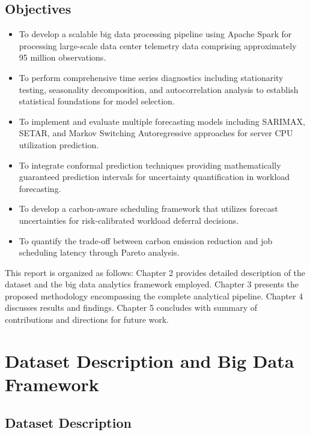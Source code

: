 \documentclass[12pt]{report}
\begin{document}
\section{Objectives}
\begin{itemize}
    \item To develop a scalable big data processing pipeline using Apache Spark for processing large-scale data center telemetry data comprising approximately 95 million observations.
    
    \item To perform comprehensive time series diagnostics including stationarity testing, seasonality decomposition, and autocorrelation analysis to establish statistical foundations for model selection.
    
    \item To implement and evaluate multiple forecasting models including SARIMAX, SETAR, and Markov Switching Autoregressive approaches for server CPU utilization prediction.
    
    \item To integrate conformal prediction techniques providing mathematically guaranteed prediction intervals for uncertainty quantification in workload forecasting.
    
    \item To develop a carbon-aware scheduling framework that utilizes forecast uncertainties for risk-calibrated workload deferral decisions.
    
    \item To quantify the trade-off between carbon emission reduction and job scheduling latency through Pareto analysis.
\end{itemize}


This report is organized as follows: Chapter 2 provides detailed description of the dataset and the big data analytics framework employed. Chapter 3 presents the proposed methodology encompassing the complete analytical pipeline. Chapter 4 discusses results and findings. Chapter 5 concludes with summary of contributions and directions for future work.


\chapter{Dataset Description and Big Data Framework}

\section{Dataset Description}
\end{document}
